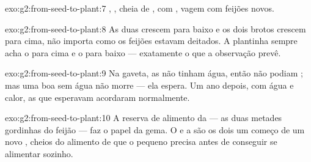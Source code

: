 \begin{solution}{exo:g2:from-seed-to-plant:7}
, ,  cheia de ,  com , vagem
com feijões novos.
\end{solution}

\begin{solution}{exo:g2:from-seed-to-plant:8}
As duas  crescem para baixo e os dois brotos crescem para
cima, não importa como os feijões estavam deitados. A plantinha
sempre acha o para cima e o para baixo --- exatamente o que a
observação prevê.
\end{solution}

\begin{solution}{exo:g2:from-seed-to-plant:9}
Na gaveta, as  não tinham água, então não podiam ;
mas uma  boa sem água não morre --- ela espera. Um ano
depois, com água e calor, as  que esperavam acordaram
normalmente.
\end{solution}

\begin{solution}{exo:g2:from-seed-to-plant:10}
A reserva de alimento da  --- as duas metades gordinhas do
feijão --- faz o papel da gema. O  e a  são os dois um
começo de um novo , cheios do alimento de que o pequeno
precisa antes de conseguir se alimentar sozinho.
\end{solution}
